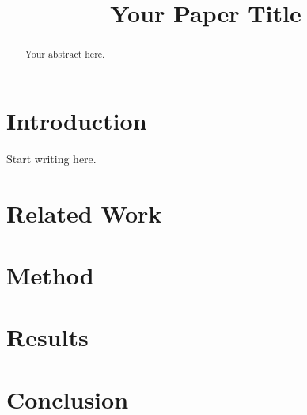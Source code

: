 \documentclass[conference]{IEEEtran}
\title{Your Paper Title}
\author{
  \IEEEauthorblockN{Author Name}
  \IEEEauthorblockA{Department \\ University \\ email@example.com}
}
\begin{document}
\maketitle

\begin{abstract}
Your abstract here.
\end{abstract}

\section{Introduction}
Start writing here.

\section{Related Work}

\section{Method}

\section{Results}

\section{Conclusion}



\end{document}
